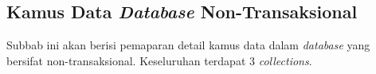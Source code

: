 
\subsection{Kamus Data \textit{Database} Non-Transaksional}

	Subbab ini akan berisi pemaparan detail kamus data dalam \textit{database} yang bersifat non-transaksional. Keseluruhan terdapat 3 \textit{collections}.

	
		

%   	
     	